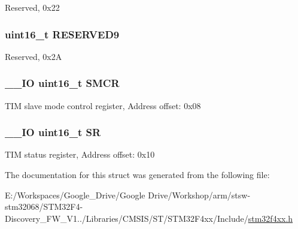 Reserved, 0x22 \hypertarget{struct_t_i_m___type_def_ad8b1fadb520f7a200ee0046e110edc79}{
\subsubsection[{R\-E\-S\-E\-R\-V\-E\-D9}]{\setlength{\rightskip}{0pt plus 5cm}uint16\-\_\-t R\-E\-S\-E\-R\-V\-E\-D9}}\label{struct_t_i_m___type_def_ad8b1fadb520f7a200ee0046e110edc79}
Reserved, 0x2\-A \hypertarget{struct_t_i_m___type_def_a02758713abfe580460dd5bcd8762702a}{
\subsubsection[{S\-M\-C\-R}]{\setlength{\rightskip}{0pt plus 5cm}\-\_\-\-\_\-\-I\-O uint16\-\_\-t S\-M\-C\-R}}\label{struct_t_i_m___type_def_a02758713abfe580460dd5bcd8762702a}
T\-I\-M slave mode control register, Address offset\-: 0x08 \hypertarget{struct_t_i_m___type_def_a44962ea5442d203bf4954035d1bfeb9d}{
\subsubsection[{S\-R}]{\setlength{\rightskip}{0pt plus 5cm}\-\_\-\-\_\-\-I\-O uint16\-\_\-t S\-R}}\label{struct_t_i_m___type_def_a44962ea5442d203bf4954035d1bfeb9d}
T\-I\-M status register, Address offset\-: 0x10 

The documentation for this struct was generated from the following file\-:\begin{DoxyCompactItemize}
\item 
E\-:/\-Workspaces/\-Google\-\_\-\-Drive/\-Google Drive/\-Workshop/arm/stsw-\/stm32068/\-S\-T\-M32\-F4-\/\-Discovery\-\_\-\-F\-W\-\_\-\-V1../\-Libraries/\-C\-M\-S\-I\-S/\-S\-T/\-S\-T\-M32\-F4xx/\-Include/\hyperlink{stm32f4xx_8h}{stm32f4xx.\-h}\end{DoxyCompactItemize}
